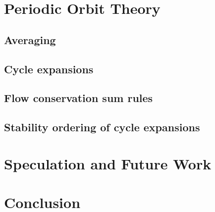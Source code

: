 \chapter{Periodic Orbit Theory}
\label{chap:POT}
    \section{Averaging}
    

    \section{Cycle expansions}
        \label{sec:cycExp}
        

    \section{Flow conservation sum rules}
        \label{s-Cons-m-flow}
        

    \section{Stability ordering of cycle expansions}
        \label{s-StabOrd}
         



\chapter{Speculation and Future Work}
   \label{chap:tobedone}
   

\chapter{Conclusion}
   \label{chap:concl}
   


\appendix

